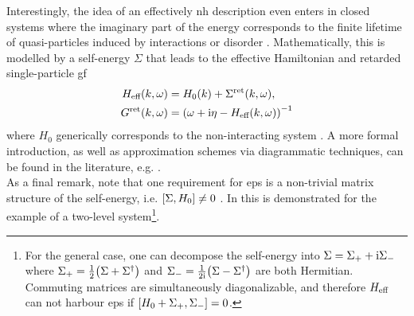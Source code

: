 Interestingly, the idea of an effectively \gls{nh} description even enters in closed systems where the imaginary part of the energy corresponds to the finite lifetime of quasi-particles induced by interactions or disorder \cite{NHT_FiniteLifetime_QuasiParticles_Kozii_2017,NH_Heff_SelfEnergy_1d_Hubbard_Rausch_2021,NH_SkinEffect_QuasiParticles_NNint_Micallo_2023}.
Mathematically, this is modelled by a self-energy $\Sigma$ that leads to the effective Hamiltonian and retarded single-particle \gls{gf} 
\begin{align}
H_\eff(k,\omega) &= H_0(k) + \Sigma^\ret(k,\omega) \label{eqn:ep:h_eff_def}, \\
\sgf^\ret(k,\omega) &= \kla*{\omega + \i \eta - H_\eff(k,\omega)}^{-1} \label{eqn:ep:g_ret_from_h_eff}
\end{align}
where $H_0$ generically corresponds to the non-interacting system \cite{NHT_FiniteLifetime_QuasiParticles_Kozii_2017,NH_Heff_SelfEnergy_1d_Hubbard_Rausch_2021,GF_SelfEnergyFunctionals_Eder_2021}.
A more formal introduction, as well as approximation schemes via diagrammatic techniques, can be found in the literature, e.g. \cite[]{AltlandSimons}.\\
As a final remark, note that one requirement for \glspl{ep} is a non-trivial matrix structure of the self-energy, i.e. $\klb*{\Sigma, H_0} \neq 0$ \cite{EP_DynamicInduced_Quenched_Lehmann_2021,NH_SkinEffect_QuasiParticles_NNint_Micallo_2023}.
In \cite[]{EP_Physics_Heiss_2012} this is demonstrated for the example of a two-level system\footnote{For the general case, one can decompose the self-energy into $\Sigma = \Sigma_+ + \i\Sigma_-$ where $\Sigma_+ = \frac{1}{2} \kla*{\Sigma + \Sigma^\dagger}$ and $\Sigma_- = \frac{1}{2\i} \kla*{\Sigma - \Sigma^\dagger}$ are both Hermitian. Commuting matrices are simultaneously diagonalizable, and therefore $H_\eff$ can not harbour \glspl{ep} if $\klb*{H_0 + \Sigma_+, \Sigma_-} = 0$.}.
